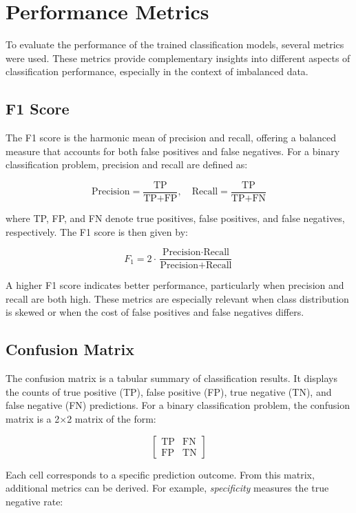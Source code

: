 \documentclass{pracalicmgr}
\begin{document}
\section{Performance Metrics}

To evaluate the performance of the trained classification models, several metrics were used. These metrics provide complementary insights into different aspects of classification performance, especially in the context of imbalanced data.

\subsection{F1 Score}

The F1 score is the harmonic mean of precision and recall, offering a balanced measure that accounts for both false positives and false negatives. For a binary classification problem, precision and recall are defined as:

\[
\text{Precision} = \frac{\text{TP}}{\text{TP} + \text{FP}}, \quad
\text{Recall} = \frac{\text{TP}}{\text{TP} + \text{FN}}
\]

where TP, FP, and FN denote true positives, false positives, and false negatives, respectively. The F1 score is then given by:

\[
F_1 = 2 \cdot \frac{\text{Precision} \cdot \text{Recall}}{\text{Precision} + \text{Recall}}
\]

A higher F1 score indicates better performance, particularly when precision and recall are both high. These metrics are especially relevant when class distribution is skewed or when the cost of false positives and false negatives differs.

\subsection{Confusion Matrix}

The confusion matrix is a tabular summary of classification results. It displays the counts of true positive (TP), false positive (FP), true negative (TN), and false negative (FN) predictions. For a binary classification problem, the confusion matrix is a 2×2 matrix of the form:

\[
\begin{bmatrix}
\text{TP} & \text{FN} \\
\text{FP} & \text{TN}
\end{bmatrix}
\]

Each cell corresponds to a specific prediction outcome. From this matrix, additional metrics can be derived. For example, \textit{specificity} measures the true negative rate:
\end{document}
